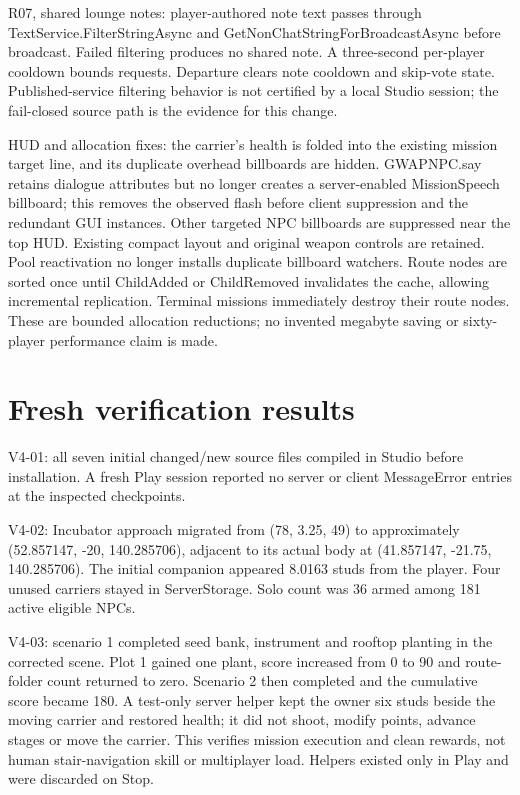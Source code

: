 R07, shared lounge notes: player-authored note text passes through TextService.\allowbreak{}FilterStringAsync and GetNonChatStringForBroadcastAsync before broadcast.\allowbreak{} Failed filtering produces no shared note.\allowbreak{} A three-second per-player cooldown bounds requests.\allowbreak{} Departure clears note cooldown and skip-vote state.\allowbreak{} Published-service filtering behavior is not certified by a local Studio session; the fail-closed source path is the evidence for this change.\allowbreak{}

HUD and allocation fixes: the carrier's health is folded into the existing mission target line, and its duplicate overhead billboards are hidden.\allowbreak{} GWAPNPC.\allowbreak{}say retains dialogue attributes but no longer creates a server-enabled MissionSpeech billboard; this removes the observed flash before client suppression and the redundant GUI instances.\allowbreak{} Other targeted NPC billboards are suppressed near the top HUD.\allowbreak{} Existing compact layout and original weapon controls are retained.\allowbreak{} Pool reactivation no longer installs duplicate billboard watchers.\allowbreak{} Route nodes are sorted once until ChildAdded or ChildRemoved invalidates the cache, allowing incremental replication.\allowbreak{} Terminal missions immediately destroy their route nodes.\allowbreak{} These are bounded allocation reductions; no invented megabyte saving or sixty-player performance claim is made.\allowbreak{}

\section{Fresh verification results}
V4-01: all seven initial changed/\allowbreak{}new source files compiled in Studio before installation.\allowbreak{} A fresh Play session reported no server or client MessageError entries at the inspected checkpoints.\allowbreak{}

V4-02: Incubator approach migrated from (78, 3.\allowbreak{}25, 49) to approximately (52.\allowbreak{}857147, -20, 140.\allowbreak{}285706), adjacent to its actual body at (41.\allowbreak{}857147, -21.\allowbreak{}75, 140.\allowbreak{}285706).\allowbreak{} The initial companion appeared 8.\allowbreak{}0163 studs from the player.\allowbreak{} Four unused carriers stayed in ServerStorage.\allowbreak{} Solo count was 36 armed among 181 active eligible NPCs.\allowbreak{}

V4-03: scenario 1 completed seed bank, instrument and rooftop planting in the corrected scene.\allowbreak{} Plot 1 gained one plant, score increased from 0 to 90 and route-folder count returned to zero.\allowbreak{} Scenario 2 then completed and the cumulative score became 180.\allowbreak{} A test-only server helper kept the owner six studs beside the moving carrier and restored health; it did not shoot, modify points, advance stages or move the carrier.\allowbreak{} This verifies mission execution and clean rewards, not human stair-navigation skill or multiplayer load.\allowbreak{} Helpers existed only in Play and were discarded on Stop.\allowbreak{}

